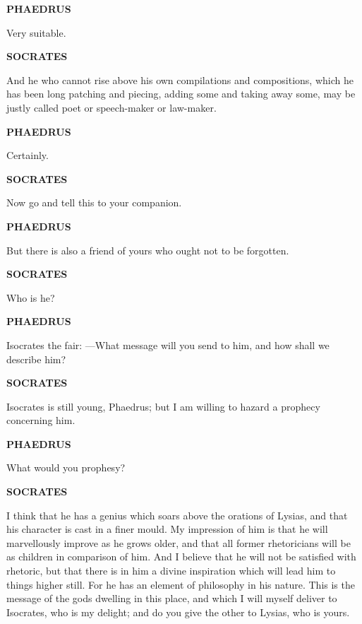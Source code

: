 \documentclass[11pt,letter]{article}
\begin{document}
\par \textbf{PHAEDRUS}
\par   Very suitable.

\par \textbf{SOCRATES}
\par   And he who cannot rise above his own compilations and compositions, which he has been long patching and piecing, adding some and taking away some, may be justly called poet or speech-maker or law-maker.

\par \textbf{PHAEDRUS}
\par   Certainly.

\par \textbf{SOCRATES}
\par   Now go and tell this to your companion.

\par \textbf{PHAEDRUS}
\par   But there is also a friend of yours who ought not to be forgotten.

\par \textbf{SOCRATES}
\par   Who is he?

\par \textbf{PHAEDRUS}
\par   Isocrates the fair: —What message will you send to him, and how shall we describe him?

\par \textbf{SOCRATES}
\par   Isocrates is still young, Phaedrus; but I am willing to hazard a prophecy concerning him.

\par \textbf{PHAEDRUS}
\par   What would you prophesy?

\par \textbf{SOCRATES}
\par   I think that he has a genius which soars above the orations of Lysias, and that his character is cast in a finer mould. My impression of him is that he will marvellously improve as he grows older, and that all former rhetoricians will be as children in comparison of him. And I believe that he will not be satisfied with rhetoric, but that there is in him a divine inspiration which will lead him to things higher still. For he has an element of philosophy in his nature. This is the message of the gods dwelling in this place, and which I will myself deliver to Isocrates, who is my delight; and do you give the other to Lysias, who is yours.
\end{document}

